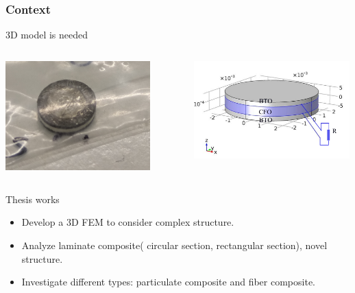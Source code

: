 \documentclass[compress]{beamer}
\begin{document}
\begin{frame}\frametitle{Context}
\vspace{-10.5pt}
\begin{alertblock}{3D model is needed}
\begin{columns}[totalwidth=\textwidth] 
   \begin{column}{.5\textwidth}
   \raggedleft
\includegraphics[width=0.83\textwidth]{Graphic/01_photoMEcircle.png}
	\end{column}
	\begin{column}{.5\textwidth}
	\includegraphics[width=0.99\textwidth]{Graphic/01_geoMEcircu.pdf}
	\end{column}
\end{columns}
\end{alertblock}
\begin{exampleblock}{Thesis works} 
  \begin{itemize}[label=$\bullet$, font=\small, leftmargin=*]
	\item Develop a 3D FEM to consider complex structure.
	\item Analyze laminate composite( circular section, rectangular section), novel structure.
	\item Investigate different types: particulate composite and fiber composite.
	\end{itemize}
\end{exampleblock}	
\end{frame}
\end{document}
